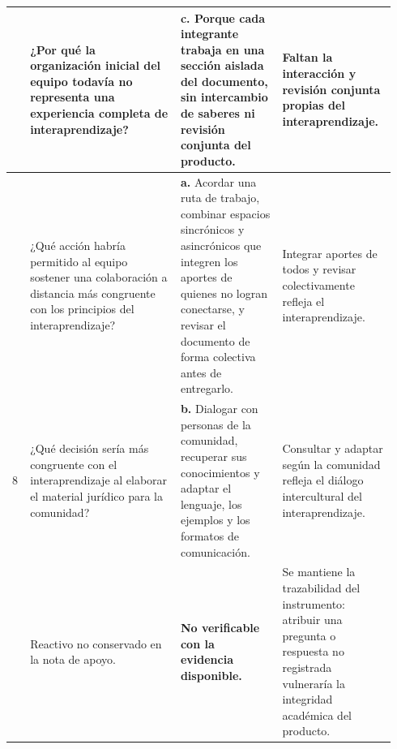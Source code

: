 \documentclass[
  spanish,
  letterpaper, oneside
]{article}
\begin{document}
\begin{landscape}
\begin{longtable}{@{}>{\centering\arraybackslash}p{0.045\linewidth}>{\raggedright\arraybackslash}p{0.37\linewidth}>{\raggedright\arraybackslash}p{0.25\linewidth}>{\raggedright\arraybackslash}p{0.27\linewidth}@{}}
6 & ¿Por qué la organización inicial del equipo todavía no representa una experiencia completa de interaprendizaje? & \textbf{c.} Porque cada integrante trabaja en una sección aislada del documento, sin intercambio de saberes ni revisión conjunta del producto. & Faltan la interacción y revisión conjunta propias del interaprendizaje. \\
\midrule
7 & ¿Qué acción habría permitido al equipo sostener una colaboración a distancia más congruente con los principios del interaprendizaje? & \textbf{a.} Acordar una ruta de trabajo, combinar espacios sincrónicos y asincrónicos que integren los aportes de quienes no logran conectarse, y revisar el documento de forma colectiva antes de entregarlo. & Integrar aportes de todos y revisar colectivamente refleja el interaprendizaje. \\
\midrule
8 & ¿Qué decisión sería más congruente con el interaprendizaje al elaborar el material jurídico para la comunidad? & \textbf{b.} Dialogar con personas de la comunidad, recuperar sus conocimientos y adaptar el lenguaje, los ejemplos y los formatos de comunicación. & Consultar y adaptar según la comunidad refleja el diálogo intercultural del interaprendizaje. \\
\midrule
9 & Reactivo no conservado en la nota de apoyo. & \textbf{No verificable con la evidencia disponible.} & Se mantiene la trazabilidad del instrumento: atribuir una pregunta o respuesta no registrada vulneraría la integridad académica del producto. \\

\end{longtable}
\end{landscape}
\end{document}
